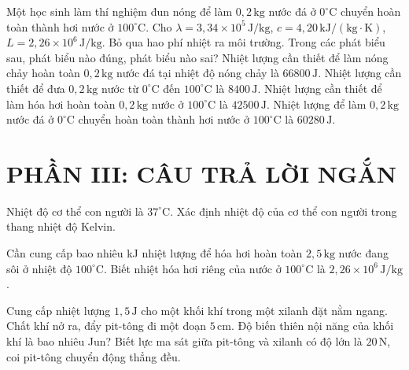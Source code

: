 \begin{ex}
Một học sinh làm thí nghiệm đun nóng để làm $0{,}2\,\mathrm{kg}$ nước đá ở $0^\circ\mathrm{C}$ chuyển hoàn toàn thành hơi nước ở $100^\circ\mathrm{C}$. Cho $\lambda=3{,}34\times10^5\,\mathrm{J/kg}$, $c=4{,}20\,\mathrm{kJ/(kg\cdot K)}$, $L=2{,}26\times10^6\,\mathrm{J/kg}$. Bỏ qua hao phí nhiệt ra môi trường. Trong các phát biểu sau, phát biểu nào đúng, phát biểu nào sai?
\choiceTF
{\True Nhiệt lượng cần thiết để làm nóng chảy hoàn toàn $0{,}2\,\mathrm{kg}$ nước đá tại nhiệt độ nóng chảy là $66800\,\mathrm{J}$.}
{Nhiệt lượng cần thiết để đưa $0{,}2\,\mathrm{kg}$ nước từ $0^\circ\mathrm{C}$ đến $100^\circ\mathrm{C}$ là $8400\,\mathrm{J}$.}
{Nhiệt lượng cần thiết để làm hóa hơi hoàn toàn $0{,}2\,\mathrm{kg}$ nước ở $100^\circ\mathrm{C}$ là $42500\,\mathrm{J}$.}
{Nhiệt lượng để làm $0{,}2\,\mathrm{kg}$ nước đá ở $0^\circ\mathrm{C}$ chuyển hoàn toàn thành hơi nước ở $100^\circ\mathrm{C}$ là $60280\,\mathrm{J}$.}
\end{ex}

\section*{PHẦN III: CÂU TRẢ LỜI NGẮN}

\begin{ex}
Nhiệt độ cơ thể con người là $37^\circ\mathrm{C}$. Xác định nhiệt độ của cơ thể con người trong thang nhiệt độ Kelvin.
\end{ex}

\begin{ex}
Cần cung cấp bao nhiêu kJ nhiệt lượng để hóa hơi hoàn toàn $2{,}5\,\mathrm{kg}$ nước đang sôi ở nhiệt độ $100^\circ\mathrm{C}$. Biết nhiệt hóa hơi riêng của nước ở $100^\circ\mathrm{C}$ là $2{,}26\times10^6\,\mathrm{J/kg}$.
\end{ex}

\begin{ex}
Cung cấp nhiệt lượng $1{,}5\,\mathrm{J}$ cho một khối khí trong một xilanh đặt nằm ngang. Chất khí nở ra, đẩy pit-tông đi một đoạn $5\,\mathrm{cm}$. Độ biến thiên nội năng của khối khí là bao nhiêu Jun? Biết lực ma sát giữa pit-tông và xilanh có độ lớn là $20\,\mathrm{N}$, coi pit-tông chuyển động thẳng đều.
\end{ex}

